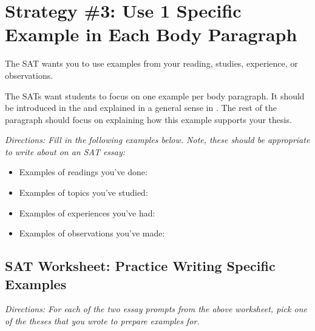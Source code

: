 \section{\sloppy Strategy \#3: Use 1 Specific Example in Each Body Paragraph}

The SAT wants you to use examples from your reading, studies, experience, or observations.

The SATs want students to focus on one example per body paragraph. It should be introduced in \shortline the and explained in a general sense in \shortline. The rest of the paragraph should focus on explaining how this example supports your thesis.

\textit{Directions: Fill in the following examples below. Note, these should be appropriate to write about on an SAT essay:}

\begin{spacing}{1.5}
\begin{itemize}
\item Examples of readings you've done: \hrulefill

\hrulefill

\item Examples of topics you've studied: \hrulefill

\hrulefill

\item Examples of experiences you've had: \hrulefill

\hrulefill

\item Examples of observations you've made: \hrulefill

\hrulefill
\end{itemize}
\end{spacing}

\subsection{SAT Worksheet: Practice Writing Specific Examples}

\textit{Directions: For each of the two essay prompts from the above worksheet, pick one of the theses
that you wrote to prepare examples for.}

